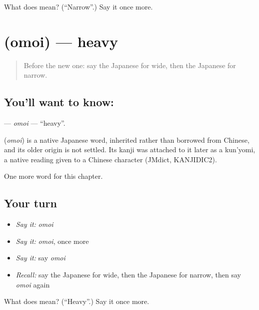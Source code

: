 \begin{tcolorbox}[breakable,colback=teal!4,colframe=teal!35!black,title={Before you move on}]
What does  mean? (\textquotedblleft{}Narrow\textquotedblright{}.) Say it once more.
\end{tcolorbox}
\section[\texorpdfstring{\ja{おもい} (omoi)}{おもい (omoi)}]{ (omoi) — heavy}

\label{lesson:JA-C50-omoi}



\begin{quote}
Before the new one: say the Japanese for wide, then the Japanese for narrow.
\end{quote}

\subsection*{You'll want to know: }
\textbf{} — \emph{omoi} — \textquotedblleft{}heavy\textquotedblright{}.

\begin{cousinweb}
\textbf{} (\emph{omoi}) is a native Japanese word, inherited rather than borrowed from Chinese, and its older origin is not settled. Its kanji was attached to it later as a kun'yomi, a native reading given to a Chinese character (JMdict, KANJIDIC2).
\end{cousinweb}

\begin{grammarlens}[title={What you've built}]
One more word for this chapter.
\end{grammarlens}

\subsection*{Your turn}
\begin{itemize}
\raggedright
  \item \emph{Say it:} \emph{omoi}
  \item \emph{Say it:} \emph{omoi}, once more
  \item \emph{Say it:} say \emph{omoi}
  \item \emph{Recall:} say the Japanese for wide, then the Japanese for narrow, then say \emph{omoi} again
\end{itemize}

\begin{tcolorbox}[breakable,colback=teal!4,colframe=teal!35!black,title={Before you move on}]
What does  mean? (\textquotedblleft{}Heavy\textquotedblright{}.) Say it once more.
\end{tcolorbox}
